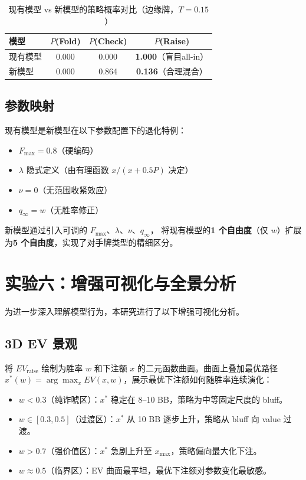 \documentclass[12pt,a4paper]{ctexart}
\begin{document}
\begin{table}[H]
\centering
\caption{现有模型 vs 新模型的策略概率对比（边缘牌，$T=0.15$）}
\begin{tabular}{@{}lccc@{}}
\toprule
\textbf{模型} & \textbf{$P$(Fold)} & \textbf{$P$(Check)} & \textbf{$P$(Raise)} \\
\midrule
现有模型 & 0.000 & 0.000 & \textbf{1.000}（盲目all-in） \\
新模型   & 0.000 & 0.864 & \textbf{0.136}（合理混合） \\
\bottomrule
\end{tabular}
\end{table}

\subsection{参数映射}

现有模型是新模型在以下参数配置下的退化特例：
\begin{itemize}
    \item $F_{\max} = 0.8$（硬编码）
    \item $\lambda$ 隐式定义（由有理函数 $x/(x+0.5P)$ 决定）
    \item $\nu = 0$（无范围收紧效应）
    \item $q_{\infty} = w$（无胜率修正）
\end{itemize}

新模型通过引入可调的 $F_{\max}$、$\lambda$、$\nu$、$q_{\infty}$，
将现有模型的\textbf{1 个自由度}（仅 $w$）扩展为\textbf{5 个自由度}，实现了对手牌类型的精细区分。

\section{实验六：增强可视化与全景分析}

为进一步深入理解模型行为，本研究进行了以下增强可视化分析。

\subsection{3D EV 景观}

将 $EV_{\text{raise}}$ 绘制为胜率 $w$ 和下注额 $x$ 的二元函数曲面。曲面上叠加最优路径
$x^*(w) = \arg\max_x EV(x, w)$，展示最优下注额如何随胜率连续演化：
\begin{itemize}
    \item $w < 0.3$（纯诈唬区）：$x^*$ 稳定在 8--10 BB，策略为中等固定尺度的 bluff。
    \item $w \in [0.3, 0.5]$（过渡区）：$x^*$ 从 10 BB 逐步上升，策略从 bluff 向 value 过渡。
    \item $w > 0.7$（强价值区）：$x^*$ 急剧上升至 $x_{\max}$，策略偏向最大化下注。
    \item $w \approx 0.5$（临界区）：EV 曲面最平坦，最优下注额对参数变化最敏感。
\end{itemize}
\end{document}
